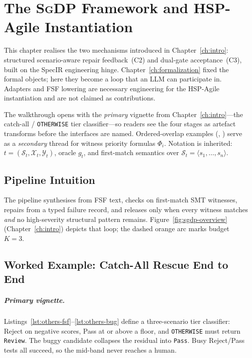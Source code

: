 
\chapter{The \textsc{SgDP} Framework and HSP-Agile Instantiation}
\label{ch:method}

This chapter realises the two mechanisms introduced in
Chapter~\ref{ch:intro}: structured scenario-aware repair feedback~(C2) and
dual-gate acceptance~(C3), built on the SpecIR engineering hinge.
Chapter~\ref{ch:formalization} fixed the formal objects; here they become a
loop that an LLM can participate in.
Adapters and FSF lowering are necessary engineering for the HSP-Agile
instantiation and are not claimed as contributions.

The walkthrough opens with the \emph{primary} vignette from
Chapter~\ref{ch:intro}---the catch-all / \texttt{OTHERWISE} tier classifier---so
readers see the four stages as artefact transforms before the interfaces are
named.
Ordered-overlap examples (, ) serve as
a \emph{secondary} thread for witness priority formulas $\Phi_i$.
Notation is inherited:
$t = (\mathcal{S}_t, \mathcal{X}_t, \mathcal{Y}_t)$, oracle $g_t$, and
first-match semantics over $\mathcal{S}_t = \langle s_1,\ldots,s_n\rangle$.

\section{Pipeline Intuition}
\label{sec:method:intuition}

The pipeline synthesises from FSF text, checks on first-match SMT witnesses,
repairs from a typed failure record, and releases only when every witness
matches \emph{and} no high-severity structural pattern remains.
Figure~\ref{fig:sgdp-overview} (Chapter~\ref{ch:intro}) depicts that loop; the
dashed orange arc marks budget~$K=3$.

\section{Worked Example: Catch-All Rescue End to End}
\label{sec:method:worked}

\paragraph{Primary vignette.}
Listings~\ref{lst:others-fsf}--\ref{lst:others-bug} define a three-scenario
tier classifier: Reject on negative scores, Pass at or above a floor, and
\texttt{OTHERWISE} must return \texttt{Review}.
The buggy candidate collapses the residual into \texttt{Pass}.
Busy Reject/Pass tests all succeed, so the mid-band never reaches a human.

